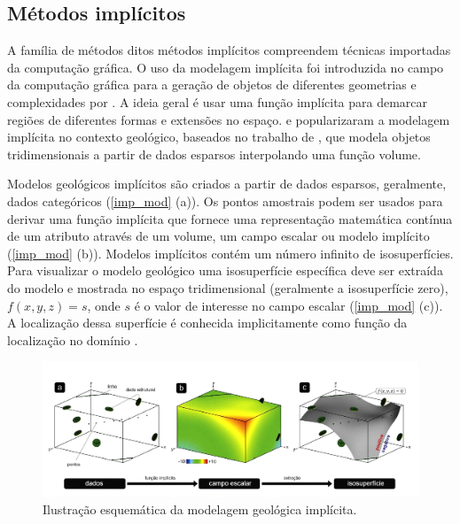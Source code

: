 \subsection{Métodos implícitos}
 
A família de métodos ditos métodos implícitos compreendem técnicas importadas da computação gráfica. O uso da modelagem implícita foi introduzida no campo da computação gráfica para a geração de objetos de diferentes geometrias e complexidades por  . A ideia geral é usar uma função implícita para demarcar regiões de diferentes formas e extensões no espaço.  e  popularizaram a modelagem implícita no contexto geológico, baseados no trabalho de , que modela objetos tridimensionais a partir de dados esparsos interpolando uma função volume.

Modelos geológicos implícitos são criados a partir de dados esparsos, geralmente, dados categóricos (\autoref{imp_mod} (a)). Os pontos amostrais podem ser usados para derivar uma função implícita que fornece uma representação matemática contínua de um atributo através de um volume, um campo escalar ou modelo implícito (\autoref{imp_mod} (b)). Modelos implícitos contém um número infinito de isosuperfícies. Para visualizar o modelo geológico uma isosuperfície específica deve ser extraída do modelo e mostrada no espaço tridimensional (geralmente a isosuperfície zero), $f(x,y,z)=s$, onde $s$ é o valor de interesse no campo escalar (\autoref{imp_mod} (c)). A localização dessa superfície é conhecida implicitamente como função da localização no domínio \cite{martin2017implicitmodeling}. 

\begin{figure}[H]
    \centering
	\caption{\label{imp_mod}Ilustração esquemática da modelagem geológica implícita.}
	\includegraphics[width=\textwidth]{capitulo_2/imagens/implicit_modelig_pt_1.jpg}
\end{figure}

